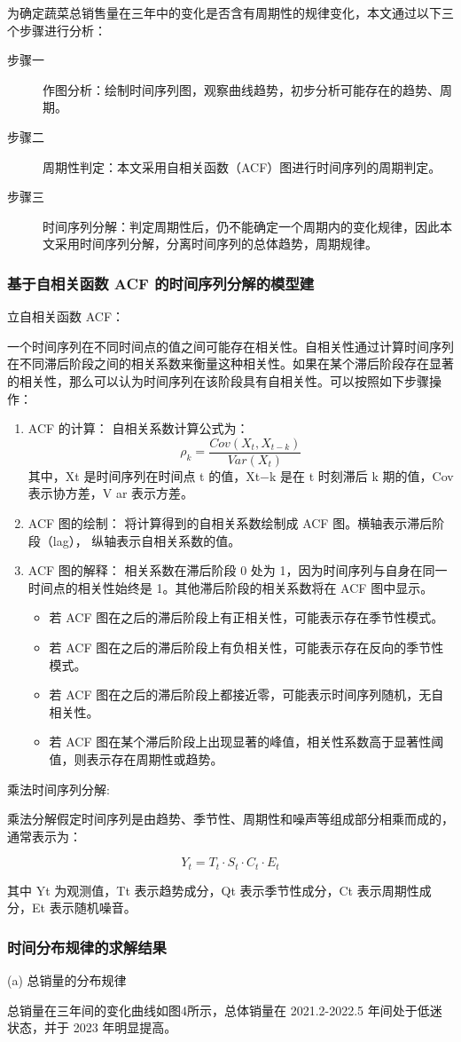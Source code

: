 \documentclass[withoutpreface,bwprint]{cumcmthesis} %
\begin{document}
为确定蔬菜总销售量在三年中的变化是否含有周期性的规律变化，本文通过以下三个步骤进行分析：

\begin{description}
	\item[步骤一] 作图分析：绘制时间序列图，观察曲线趋势，初步分析可能存在的趋势、周期。
	\item[步骤二] 周期性判定：本文采用自相关函数（ACF）图进行时间序列的周期判定。
	\item[步骤三] 时间序列分解：判定周期性后，仍不能确定一个周期内的变化规律，因此本文采用时间序列分解，分离时间序列的总体趋势，周期规律。
\end{description}

\subsubsection{基于自相关函数 ACF 的时间序列分解的模型建}

立自相关函数 ACF：

一个时间序列在不同时间点的值之间可能存在相关性。自相关性通过计算时间序列在不同滞后阶段之间的相关系数来衡量这种相关性。如果在某个滞后阶段存在显著的相关性，那么可以认为时间序列在该阶段具有自相关性。可以按照如下步骤操作：

\begin{enumerate}
	\item ACF 的计算：
	自相关系数计算公式为：
	$$
	\rho _k=\frac{Cov\left( X_t,X_{t-k} \right)}{Var\left( X_t \right)}
	$$
	其中，Xt 是时间序列在时间点 t 的值，Xt−k 是在 t 时刻滞后 k 期的值，Cov 表示协方差，V ar 表示方差。
	
	\item ACF 图的绘制：
	将计算得到的自相关系数绘制成 ACF 图。横轴表示滞后阶段（lag），
纵轴表示自相关系数的值。

	\item ACF 图的解释：
	相关系数在滞后阶段 0 处为 1，因为时间序列与自身在同一时间点的相关性始终是 1。其他滞后阶段的相关系数将在 ACF 图中显示。

	\begin{itemize}
		\item 若 ACF 图在之后的滞后阶段上有正相关性，可能表示存在季节性模式。
		\item 若 ACF 图在之后的滞后阶段上有负相关性，可能表示存在反向的季节性模式。
		\item 若 ACF 图在之后的滞后阶段上都接近零，可能表示时间序列随机，无自相关性。
		\item 若 ACF 图在某个滞后阶段上出现显著的峰值，相关性系数高于显著性阈值，则表示存在周期性或趋势。
	\end{itemize}
\end{enumerate}

乘法时间序列分解:

乘法分解假定时间序列是由趋势、季节性、周期性和噪声等组成部分相乘而成的，通常表示为：

$$
Y_t=T_t\cdot S_t\cdot C_t\cdot E_t
$$

其中 Yt 为观测值，Tt 表示趋势成分，Qt 表示季节性成分，Ct 表示周期性成分，Et 表示随机噪音。

\subsubsection{时间分布规律的求解结果}

(a) 总销量的分布规律

总销量在三年间的变化曲线如图4所示，总体销量在 2021.2-2022.5 年间处于低迷状态，并于 2023 年明显提高。
\end{document}

